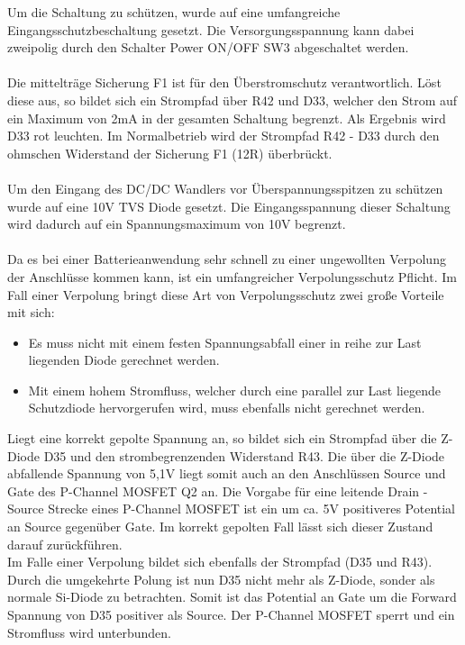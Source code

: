 \documentclass[a4paper,11pt]{scrartcl}
\begin{document}
Um die Schaltung zu schützen, wurde auf eine umfangreiche Eingangsschutzbeschaltung gesetzt. Die Versorgungsspannung kann dabei zweipolig durch den Schalter \glqq Power ON/OFF SW3 \grqq{} abgeschaltet werden.
\\
\\
Die mittelträge Sicherung F1 ist für den Überstromschutz verantwortlich. Löst diese aus, so bildet sich ein Strompfad über R42 und D33, welcher den Strom auf ein Maximum von 2mA in der gesamten Schaltung begrenzt. Als Ergebnis wird D33 rot leuchten. Im Normalbetrieb wird der Strompfad R42 - D33 durch den ohmschen Widerstand der Sicherung F1 (12R) überbrückt.
\\
\\
Um den Eingang des DC/DC Wandlers vor Überspannungsspitzen zu schützen wurde auf eine 10V TVS Diode gesetzt. Die Eingangsspannung dieser Schaltung wird dadurch auf ein Spannungsmaximum von 10V begrenzt. 
\\
\\
Da es bei einer Batterieanwendung sehr schnell zu einer ungewollten Verpolung der Anschlüsse kommen kann, ist ein umfangreicher Verpolungsschutz Pflicht. Im Fall einer Verpolung bringt diese Art von Verpolungsschutz zwei große Vorteile mit sich:
\begin{itemize}
	\item{Es muss nicht mit einem festen Spannungsabfall einer in reihe zur Last liegenden Diode gerechnet werden.}
	
	\item{Mit einem hohem Stromfluss, welcher durch eine parallel zur Last liegende Schutzdiode hervorgerufen wird, muss ebenfalls nicht gerechnet werden.}
\end{itemize}
Liegt eine korrekt gepolte Spannung an, so bildet sich ein Strompfad über die Z-Diode D35 und den strombegrenzenden Widerstand R43. Die über die Z-Diode abfallende Spannung von 5,1V liegt somit auch an den Anschlüssen \glqq Source und Gate \grqq{} des P-Channel MOSFET Q2 an. Die Vorgabe für eine leitende Drain - Source Strecke eines P-Channel MOSFET ist ein um ca. 5V positiveres Potential an Source gegenüber Gate. Im korrekt gepolten Fall lässt sich dieser Zustand darauf zurückführen.
\\ 
Im Falle einer Verpolung bildet sich ebenfalls der Strompfad (D35 und R43). Durch die umgekehrte Polung ist nun D35 nicht mehr als Z-Diode, sonder als normale Si-Diode zu betrachten. Somit ist das Potential an Gate um die \glqq Forward Spannung \grqq{} von D35 positiver als Source.  Der P-Channel MOSFET sperrt und ein Stromfluss wird unterbunden.
\\
\\
\end{document}
